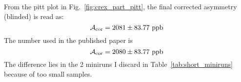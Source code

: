 From the pitt plot in Fig.~\ref{fig:crex_part_pitt}, 
the final corrected asymmetry (blinded) is read as: 
\begin{equation}
    \CA_{\text{cor}} = 2081 \pm 83.77\ \mathrm{ppb}
\end{equation}
The number used in the published paper is
\begin{equation}
    \CA_{\text{cor}} = 2080 \pm 83.77\ \mathrm{ppb}
\end{equation}
The difference lies in the 2 miniruns I discard in Table~\ref{tab:short_miniruns} because of too small
samples.
